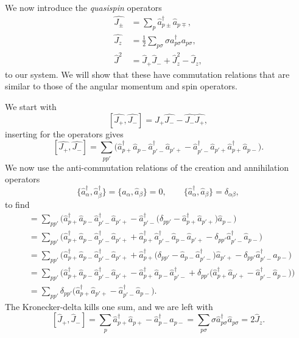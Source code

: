 \documentclass[a4paper, 11pt, notitlepage, english]{article}
\newcommand{\op}[1]{\hat{#1}}
\begin{document}
We now introduce the \emph{quasispin} operators
\begin{align*}
\op{J_\pm} &= \sum_p \op{a}_{p\pm}^\dagger \op{a}_{p\mp}, \\
\op{J_z} &= \frac{1}{2}\sum_{p\sigma}\sigma a_{p\sigma}^\dagger a_{p\sigma}, \\
\op{J}^2 &= \op{J}_+\op{J}_- + \op{J}_z^2 - \op{J}_z,
\end{align*}
to our system. We will show that these have commutation relations that are similar to those of the angular momentum and spin operators.

We start with
$$[\op{J_+}, \op{J_-}] = \op{J_+}\op{J_-} - \op{J_-}\op{J_+},$$
inserting for the operators gives
$$[\op{J_+}, \op{J_-}] = \sum_{pp'}\bigg( \op{a}_{p+}^\dagger \op{a}_{p-} \op{a}_{p'-}^\dagger \op{a}_{p'+} - \op{a}_{p'-}^\dagger \op{a}_{p'+} \op{a}_{p+}^\dagger \op{a}_{p-}\bigg).$$
We now use the anti-commutation relations of the creation and annihilation operators
$$\{\op{a}_\alpha^\dagger, \op{a}_\beta^\dagger \} = \{\op{a}_\alpha, \op{a}_\beta \} = 0, \qquad \{\op{a}_\alpha^\dagger, \op{a}_\beta \} = \delta_{\alpha\beta},$$
to find
\begin{align*}
[\op{J}_+,\op{J}_-] &= \sum_{pp'}\bigg( \op{a}_{p+}^\dagger \op{a}_{p-} \op{a}_{p'-}^\dagger \op{a}_{p'+} - \op{a}_{p'-}^\dagger \big(\delta_{pp'} - \op{a}_{p+}^\dagger\op{a}_{p'+} \big) \op{a}_{p-}\bigg) \\
&= \sum_{pp'}\bigg( \op{a}_{p+}^\dagger \op{a}_{p-} \op{a}_{p'-}^\dagger \op{a}_{p'+} + \op{a}_{p+}^\dagger  \op{a}_{p'-}^\dagger  \op{a}_{p-} \op{a}_{p'+} - \delta_{pp'} \op{a}_{p'-}^\dagger\op{a}_{p-}\bigg) \\
&= \sum_{pp'}\bigg( \op{a}_{p+}^\dagger \op{a}_{p-} \op{a}_{p'-}^\dagger \op{a}_{p'+} + \op{a}_{p+}^\dagger  \big(\delta_{pp'} -\op{a}_{p-}\op{a}_{p'-}^\dagger \big) \op{a}_{p'+} - \delta_{pp'} \op{a}_{p'-}^\dagger\op{a}_{p-}\bigg) \\
&= \sum_{pp'}\bigg( \op{a}_{p+}^\dagger \op{a}_{p-} \op{a}_{p'-}^\dagger \op{a}_{p'+} - \op{a}_{p+}^\dagger \op{a}_{p-}\op{a}_{p'-}^\dagger + \delta_{pp'}\big(\op{a}_{p+}^\dagger \op{a}_{p'+} - \op{a}_{p'-}^\dagger\op{a}_{p-}\big)\bigg) \\
&= \sum_{pp'} \delta_{pp'}\big(\op{a}_{p+}^\dagger \op{a}_{p'+} - \op{a}_{p'-}^\dagger\op{a}_{p-}\big).
\end{align*}
The Kronecker-delta kills one sum, and we are left with
$$[\op{J}_+,\op{J}_-] = \sum_p \op{a}_{p+}^\dagger \op{a}_{p+} - \op{a}_{p-}^\dagger\op{a}_{p-} = \sum_{p\sigma} \sigma \op{a}_{p\sigma}^\dagger\op{a}_{p\sigma} = 2 \op{J}_z.$$
\end{document}
